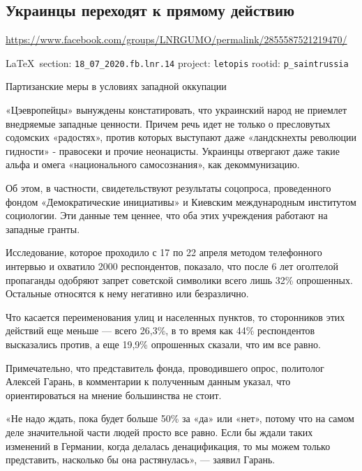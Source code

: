  
 
\subsection{Украинцы переходят к прямому действию}
\url{https://www.facebook.com/groups/LNRGUMO/permalink/2855587521219470/}
  
\vspace{0.5cm}
{\small\LaTeX~section: \verb|18_07_2020.fb.lnr.14| project: \verb|letopis| rootid: \verb|p_saintrussia|}
\vspace{0.5cm}
  
Партизанские меры в условиях западной оккупации

«Цэевропейцы» вынуждены констатировать, что украинский народ не приемлет
внедряемые западные ценности. Причем речь идет не только о пресловутых
содомских «радостях», против которых выступают даже «ландскнехты революции
гидности» - правосеки и прочие неонацисты. Украинцы отвергают даже такие альфа
и омега «национального самосознания», как декоммунизацию.

Об этом, в частности, свидетельствуют результаты соцопроса, проведенного фондом
«Демократические инициативы» и Киевским международным институтом социологии.
Эти данные тем ценнее, что оба этих учреждения работают на западные гранты.

Исследование, которое проходило с 17 по 22 апреля методом телефонного интервью
и охватило 2000 респондентов, показало, что после 6 лет оголтелой пропаганды
одобряют запрет советской символики всего лишь 32\% опрошенных. Остальные
относятся к нему негативно или безразлично.

Что касается переименования улиц и населенных пунктов, то сторонников этих
действий еще меньше --- всего 26,3\%, в то время как 44\% респондентов
высказались против, а еще 19,9\% опрошенных сказали, что им все равно.

Примечательно, что представитель фонда, проводившего опрос, политолог Алексей
Гарань, в комментарии к полученным данным указал, что ориентироваться на мнение
большинства не стоит.

«Не надо ждать, пока будет больше 50\% за «да» или «нет», потому что на самом
деле значительной части людей просто все равно. Если бы ждали таких изменений в
Германии, когда делалась денацификация, то мы можем только представить,
насколько бы она растянулась», --- заявил Гарань.

